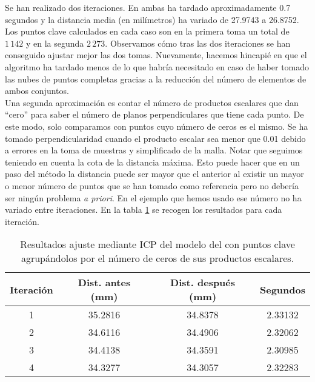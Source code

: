 Se han realizado dos iteraciones. En ambas ha tardado aproximadamente 0.7 segundos y la distancia media (en milímetros) ha variado de 27.9743 a 26.8752. Los puntos clave calculados en cada caso son en la primera toma un total de $ 1\,142 $ y en la segunda $ 2\,273 $. Observamos cómo tras las dos iteraciones se han conseguido ajustar mejor las dos tomas. Nuevamente, hacemos hincapié en que el algoritmo ha tardado menos de lo que habría necesitado en caso de haber tomado las nubes de puntos completas gracias a la reducción del número de elementos de ambos conjuntos. \\

Una segunda aproximación es contar el número de productos escalares que dan ``cero'' para saber el número de planos perpendiculares que tiene cada punto. De este modo, solo comparamos con puntos cuyo número de ceros es el mismo. Se ha tomado perpendicularidad cuando el producto escalar sea menor que 0.01 debido a errores en la toma de muestras y simplificado de la malla. Notar que seguimos teniendo en cuenta la cota de la distancia máxima. Esto puede hacer que en un paso del método la distancia puede ser mayor que el anterior al existir un mayor o menor número de puntos que se han tomado como referencia pero no debería ser ningún problema \textit{a priori}. En el ejemplo que hemos usado ese número no ha variado entre iteraciones. En la tabla \ref{talbe:ICPceros} se recogen los resultados para cada iteración.\\

\begin{table}[h!]
	\centering
	\begin{tabular}{| c | c | c | c |} 
		\hline
		Iteración & Dist. antes (mm)  & Dist. después (mm) & Segundos \\
		\hline
		1 &  35.2816 &  34.8378 & 2.33132\\			 
		2 & 34.6116 &  34.4906 &   2.32062\\	
		3 &  34.4138 & 34.3591  & 2.30985\\
		4 & 34.3277 &  34.3057 & 2.32283\\
		\hline
	\end{tabular}
	\caption{Resultados ajuste mediante ICP del modelo del con puntos clave agrupándolos por el número de ceros de sus productos escalares.}
	\label{talbe:ICPceros}
\end{table}

